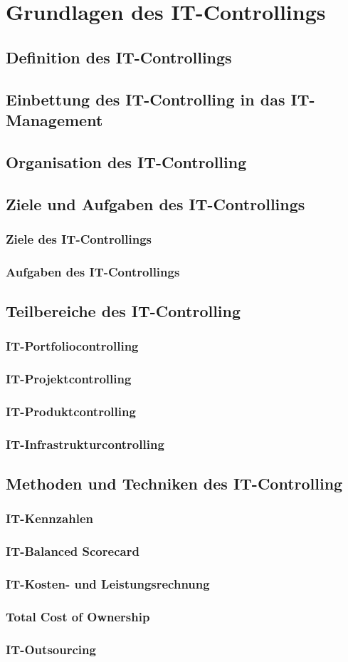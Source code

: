 \section{Grundlagen des IT-Controllings}
\subsection{Definition des IT-Controllings}
\subsection{Einbettung des IT-Controlling in das IT-Management}
\subsection{Organisation des IT-Controlling}
\subsection{Ziele und Aufgaben des IT-Controllings}
\subsubsection{Ziele des IT-Controllings}
\subsubsection{Aufgaben des IT-Controllings}
\subsection{Teilbereiche des IT-Controlling}
\subsubsection{IT-Portfoliocontrolling}
\subsubsection{IT-Projektcontrolling}
\subsubsection{IT-Produktcontrolling}
\subsubsection{IT-Infrastrukturcontrolling}
\subsection{Methoden und Techniken des IT-Controlling}
\subsubsection{IT-Kennzahlen}
\subsubsection{IT-Balanced Scorecard}
\subsubsection{IT-Kosten- und Leistungsrechnung}
\subsubsection{Total Cost of Ownership}
\subsubsection{IT-Outsourcing}